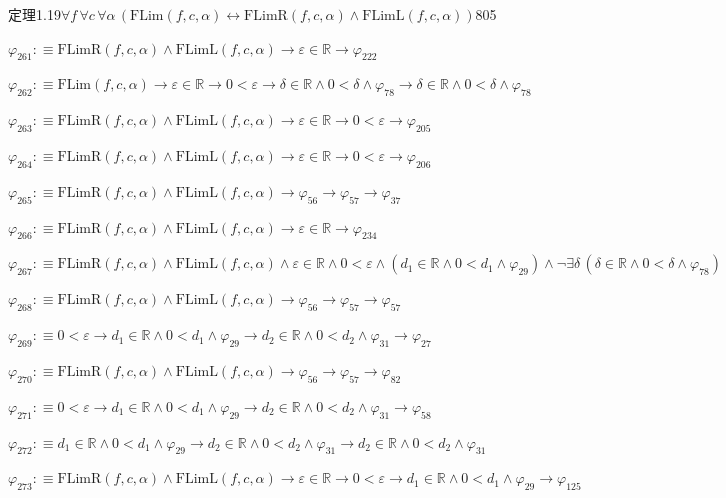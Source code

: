 \begin{fullproof}{定理1.19}{$\forall f\,\forall c\,\forall \alpha\,(\mathrm{FLim}(f,c,\alpha) \leftrightarrow \mathrm{FLimR}(f,c,\alpha) \land \mathrm{FLimL}(f,c,\alpha))$}{805}
\begin{abbrevlist}
\item $\varphi_{261} :\equiv \mathrm{FLimR}(f,c,\alpha) \land \mathrm{FLimL}(f,c,\alpha) \to \varepsilon \in \mathbb{R} \to \varphi_{222}$
\item $\varphi_{262} :\equiv \mathrm{FLim}(f,c,\alpha) \to \varepsilon \in \mathbb{R} \to 0 < \varepsilon \to \delta \in \mathbb{R} \land 0 < \delta \land \varphi_{78} \to \delta \in \mathbb{R} \land 0 < \delta \land \varphi_{78}$
\item $\varphi_{263} :\equiv \mathrm{FLimR}(f,c,\alpha) \land \mathrm{FLimL}(f,c,\alpha) \to \varepsilon \in \mathbb{R} \to 0 < \varepsilon \to \varphi_{205}$
\item $\varphi_{264} :\equiv \mathrm{FLimR}(f,c,\alpha) \land \mathrm{FLimL}(f,c,\alpha) \to \varepsilon \in \mathbb{R} \to 0 < \varepsilon \to \varphi_{206}$
\item $\varphi_{265} :\equiv \mathrm{FLimR}(f,c,\alpha) \land \mathrm{FLimL}(f,c,\alpha) \to \varphi_{56} \to \varphi_{57} \to \varphi_{37}$
\item $\varphi_{266} :\equiv \mathrm{FLimR}(f,c,\alpha) \land \mathrm{FLimL}(f,c,\alpha) \to \varepsilon \in \mathbb{R} \to \varphi_{234}$
\item $\varphi_{267} :\equiv \mathrm{FLimR}(f,c,\alpha) \land \mathrm{FLimL}(f,c,\alpha) \land \varepsilon \in \mathbb{R} \land 0 < \varepsilon \land (d_{1} \in \mathbb{R} \land 0 < d_{1} \land \varphi_{29}) \land \neg \exists \delta\,(\delta \in \mathbb{R} \land 0 < \delta \land \varphi_{78})$
\item $\varphi_{268} :\equiv \mathrm{FLimR}(f,c,\alpha) \land \mathrm{FLimL}(f,c,\alpha) \to \varphi_{56} \to \varphi_{57} \to \varphi_{57}$
\item $\varphi_{269} :\equiv 0 < \varepsilon \to d_{1} \in \mathbb{R} \land 0 < d_{1} \land \varphi_{29} \to d_{2} \in \mathbb{R} \land 0 < d_{2} \land \varphi_{31} \to \varphi_{27}$
\item $\varphi_{270} :\equiv \mathrm{FLimR}(f,c,\alpha) \land \mathrm{FLimL}(f,c,\alpha) \to \varphi_{56} \to \varphi_{57} \to \varphi_{82}$
\item $\varphi_{271} :\equiv 0 < \varepsilon \to d_{1} \in \mathbb{R} \land 0 < d_{1} \land \varphi_{29} \to d_{2} \in \mathbb{R} \land 0 < d_{2} \land \varphi_{31} \to \varphi_{58}$
\item $\varphi_{272} :\equiv d_{1} \in \mathbb{R} \land 0 < d_{1} \land \varphi_{29} \to d_{2} \in \mathbb{R} \land 0 < d_{2} \land \varphi_{31} \to d_{2} \in \mathbb{R} \land 0 < d_{2} \land \varphi_{31}$
\item $\varphi_{273} :\equiv \mathrm{FLimR}(f,c,\alpha) \land \mathrm{FLimL}(f,c,\alpha) \to \varepsilon \in \mathbb{R} \to 0 < \varepsilon \to d_{1} \in \mathbb{R} \land 0 < d_{1} \land \varphi_{29} \to \varphi_{125}$

\end{abbrevlist}
\end{fullproof}
